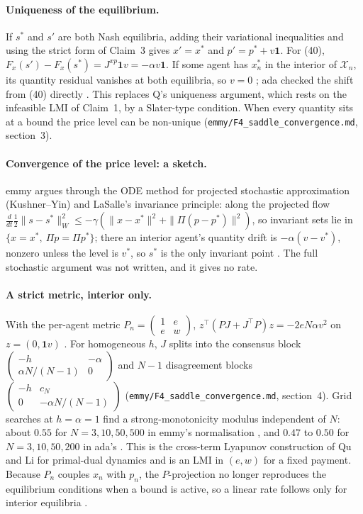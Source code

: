 \documentclass{article}
\begin{document}
\paragraph{Uniqueness of the equilibrium.}
If \(s^\ast\) and \(s'\) are both Nash equilibria, adding their variational inequalities and using the strict form of Claim~3 gives \(x'=x^\ast\) and \(p'=p^\ast+v\mathbf 1\). For (40), \(F_x(s')-F_x(s^\ast)=J^{xp}\mathbf 1v=-\alpha v\mathbf 1\). If some agent has \(x_n^\ast\) in the interior of \(\mathcal X_n\), its quantity residual vanishes at both equilibria, so \(v=0\) ; ada checked the shift from (40) directly . This replaces Q's uniqueness argument, which rests on the infeasible LMI of Claim~1, by a Slater-type condition. When every quantity sits at a bound the price level can be non-unique (\texttt{emmy/F4\_saddle\_convergence.md}, section~3).

\paragraph{Convergence of the price level: a sketch.}
emmy argues through the ODE method for projected stochastic approximation (Kushner--Yin) and LaSalle's invariance principle: along the projected flow \(\tfrac{d}{dt}\tfrac12\|s-s^\ast\|_W^2\le-\gamma(\|x-x^\ast\|^2+\|\Pi(p-p^\ast)\|^2)\), so invariant sets lie in \(\{x=x^\ast,\ \Pi p=\Pi p^\ast\}\); there an interior agent's quantity drift is \(-\alpha(v-v^\ast)\), nonzero unless the level is \(v^\ast\), so \(s^\ast\) is the only invariant point . The full stochastic argument was not written, and it gives no rate.

\paragraph{A strict metric, interior only.}
With the per-agent metric \(P_n=\begin{pmatrix}1&e\\e&w\end{pmatrix}\), \(z^\top(PJ+J^\top P)z=-2eN\alpha v^2\) on \(z=(0,\mathbf 1v)\) . For homogeneous \(h\), \(J\) splits into the consensus block \(\begin{pmatrix}-h&-\alpha\\ \alpha N/(N-1)&0\end{pmatrix}\) and \(N-1\) disagreement blocks \(\begin{pmatrix}-h&c_N\\0&-\alpha N/(N-1)\end{pmatrix}\) (\texttt{emmy/F4\_saddle\_convergence.md}, section~4). Grid searches at \(h=\alpha=1\) find a strong-monotonicity modulus independent of \(N\): about \(0.55\) for \(N=3,10,50,500\) in emmy's normalisation , and \(0.47\) to \(0.50\) for \(N=3,10,50,200\) in ada's . This is the cross-term Lyapunov construction of Qu and Li for primal-dual dynamics and is an LMI in \((e,w)\) for a fixed payment. Because \(P_n\) couples \(x_n\) with \(p_n\), the \(P\)-projection no longer reproduces the equilibrium conditions when a bound is active, so a linear rate follows only for interior equilibria .
\end{document}
